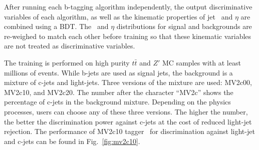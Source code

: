 \par After running each b-tagging algorithm independently, the output discriminative variables of each algorithm, as well as the kinematic properties of jet \pt~and $\eta$ are combined using a BDT. The \pt~and $\eta$ distributions for signal and backgrounds are re-weighed to match each other before training so that these kinematic variables are not treated as discriminative variables.
\par The training is performed on high purity $t\bar{t}$ and $Z'$ MC samples with at least millions of events. While b-jets are used as signal jets, 
the background is a mixture of c-jets and light-jets. Three versions of the mixture are used: MV2c00, MV2c10, and MV2c20. The number after the character ``MV2c''
shows the percentage of c-jets in the background mixture. Depending on the physics processes, users can choose any of these three versions.
The higher the number, the better the discrimination power against c-jets at the cost of reduced light-jet rejection. 
The performance of MV2c10 tagger~\cite{Varni:2655785} for discrimination against light-jet and c-jets can be found in Fig.~\ref{fig:mv2c10}.

